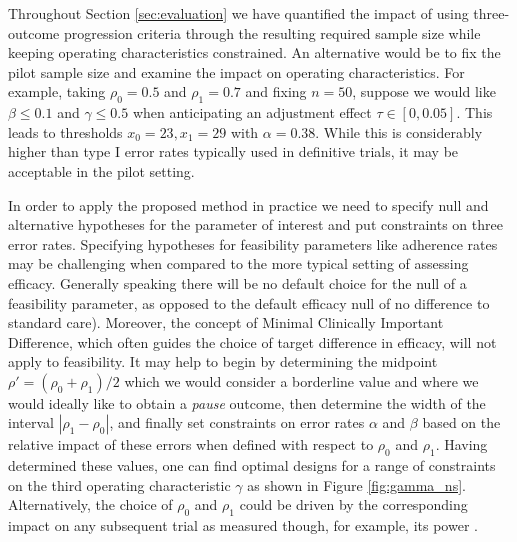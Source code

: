 \documentclass{bmcart}
\begin{document}
Throughout Section \ref{sec:evaluation} we have quantified the impact of using three-outcome progression criteria through the resulting required sample size while keeping operating characteristics constrained. An alternative would be to fix the pilot sample size and examine the impact on operating characteristics. For example, taking $\rho_0 = 0.5$ and $\rho_1 = 0.7$ and fixing $n = 50$, suppose we would like $\beta \leq 0.1$ and $\gamma \leq 0.5$ when anticipating an adjustment effect $\tau \in [0, 0.05]$. This leads to thresholds $x_0 = 23, x_1 = 29$ with $\alpha = 0.38$. While this is considerably higher than type I error rates typically used in definitive trials, it may be acceptable in the pilot setting.

In order to apply the proposed method in practice we need to specify null and alternative hypotheses for the parameter of interest and put constraints on three error rates. Specifying hypotheses for feasibility parameters like adherence rates may be challenging when compared to the more typical setting of assessing efficacy. Generally speaking there will be no default choice for the null of a feasibility parameter, as opposed to the default efficacy null of no difference to standard care). Moreover, the concept of Minimal Clinically Important Difference, which often guides the choice of target difference in efficacy, will not apply to  feasibility. It may help to begin by determining the midpoint $\rho' = (\rho_0 + \rho_1)/2$ which we would consider a borderline value and where we would ideally like to obtain a \emph{pause} outcome, then determine the width of the interval $|\rho_1 - \rho_0|$, and finally set constraints on error rates $\alpha$ and $\beta$ based on the relative impact of these errors when defined with respect to $\rho_0$ and $\rho_1$. Having determined these values, one can find optimal designs for a range of constraints on the third operating characteristic $\gamma$ as shown in Figure \ref{fig:gamma_ns}. Alternatively, the choice of $\rho_0$ and $\rho_1$ could be driven by the corresponding impact on any subsequent trial as measured though, for example, its power \cite{Wilson2021a}.
\end{document}
